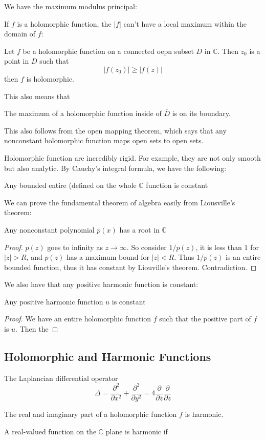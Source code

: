 \documentclass[main.tex]{subfiles}
\begin{document}
We have the maximum modulus principal:

If $f$ is a holomorphic function, the $|f|$ can't have a local maximum within the domain of $f$:

\begin{theorem}
Let $f$ be a holomorphic function on a connected oepn subset $D$ in $\mathbb{C}$. Then $z_0$ is a point in $D$ such that 
$$
|f(z_0)| \geq |f(z)|
$$
then $f$ is holomorphic.
\end{theorem}
This also means that 

\begin{corollary}
The maximum of a holomorphic function inside of $\overline{D}$ is on its boundary.
\end{corollary}
This also follows from the open mapping theorem, which says that any nonconstant holomorphic function maps open sets to open sets.

Holomorphic function are incredibly rigid. For example, they are not only smooth but also analytic. By Cauchy's integral formula, we have the following:

\begin{theorem}
Any bounded entire (defined on the whole $\mathbb{C}$ function is constant
\end{theorem}

We can prove the fundamental theorem of algebra easily from Liousville's theorem:

\begin{corollary}
Any nonconstant polynomial $p(x)$ has a root in $\mathbb{C}$
\end{corollary}
\begin{proof}
$p(z)$ goes to infinity as $z \rightarrow \infty$. So consider $1/p(z)$, it is less than $1$ for $|z| > R$, and $p(z)$ has a  maximum bound for $|z| < R$. Thus $1/p(z)$ is an entire bounded function, thus it has constant by Liouville's theorem. Contradiction.
\end{proof}

We also have that any positive harmonic function is constant:

\begin{corollary}
Any positive harmonic function $u$ is constant
\end{corollary}

\begin{proof}
We have an entire holomorphic function $f$ such that the positive part of $f$ is $u$. Then the 
\end{proof}
\subsection{Holomorphic and Harmonic Functions}

The Laplancian differential operator 
$$
\Delta = \frac{\partial^2}{\partial x^2} + \frac{\partial^2}{\partial y^2} = 4 \frac{\partial}{\partial \overline{z}} \frac{\partial}{\partial {z}}
$$

The real and imaginary part of a holomorphic function $f$ is harmonic.

A real-valued function on the $\mathbb{C}$ plane is harmonic if 
\end{document}
